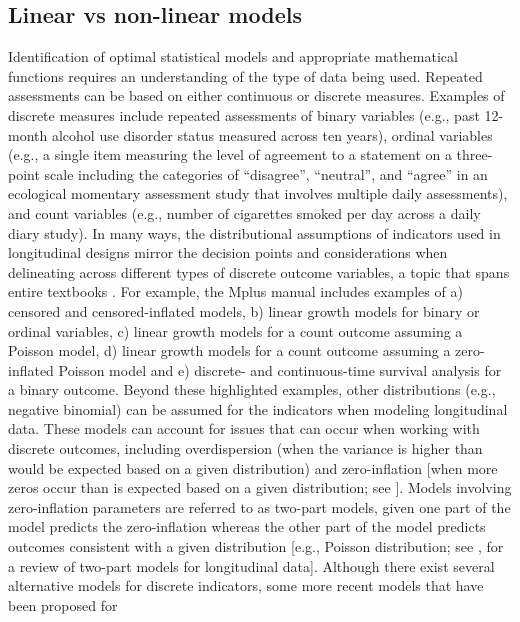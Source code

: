 \documentclass[
  10pt,
  letterpaper,
]{article}
\begin{document}
\hypertarget{linear-vs-non-linear-models}{%
\subsection{Linear vs non-linear
models}\label{linear-vs-non-linear-models}}

Identification of optimal statistical models and appropriate
mathematical functions requires an understanding of the type of data
being used. Repeated assessments can be based on either continuous or
discrete measures. Examples of discrete measures include repeated
assessments of binary variables (e.g., past 12-month alcohol use
disorder status measured across ten years), ordinal variables (e.g., a
single item measuring the level of agreement to a statement on a
three-point scale including the categories of ``disagree'', ``neutral'',
and ``agree'' in an ecological momentary assessment study that involves
multiple daily assessments), and count variables (e.g., number of
cigarettes smoked per day across a daily diary study). In many ways, the
distributional assumptions of indicators used in longitudinal designs
mirror the decision points and considerations when delineating across
different types of discrete outcome variables, a topic that spans entire
textbooks \citep[e.g., see][]{lenz2016}. For example, the Mplus manual
\citep{muthen2017} includes examples of a) censored and
censored-inflated models, b) linear growth models for binary or ordinal
variables, c) linear growth models for a count outcome assuming a
Poisson model, d) linear growth models for a count outcome assuming a
zero-inflated Poisson model and e) discrete- and continuous-time
survival analysis for a binary outcome. Beyond these highlighted
examples, other distributions (e.g., negative binomial) can be assumed
for the indicators when modeling longitudinal data. These models can
account for issues that can occur when working with discrete outcomes,
including overdispersion (when the variance is higher than would be
expected based on a given distribution) and zero-inflation {[}when more
zeros occur than is expected based on a given distribution; see
\citet{lenz2016}{]}. Models involving zero-inflation parameters are
referred to as two-part models, given one part of the model predicts the
zero-inflation whereas the other part of the model predicts outcomes
consistent with a given distribution {[}e.g., Poisson distribution; see
\citet{farewell2017}, for a review of two-part models for longitudinal
data{]}. Although there exist several alternative models for discrete
indicators, some more recent models that have been proposed for
\end{document}
